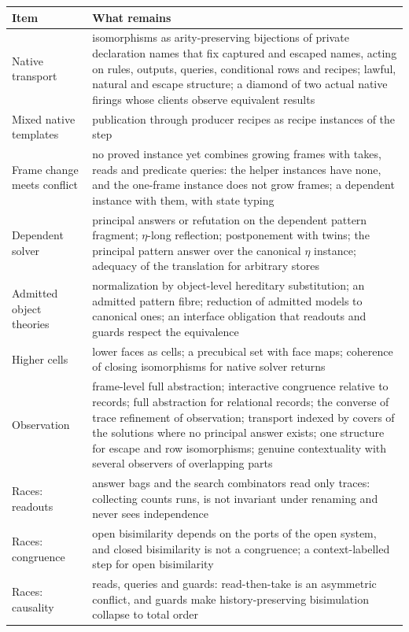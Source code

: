 \documentclass[11pt]{article}
\theoremstyle{remark}
\begin{document}
{\small
\begin{longtable}{@{}L{0.30\textwidth}L{0.65\textwidth}@{}}
\toprule
\textbf{Item} & \textbf{What remains} \\
\midrule
\endhead
Native transport & isomorphisms as arity-preserving bijections of private declaration names that fix captured and escaped names, acting on rules, outputs, queries, conditional rows and recipes; lawful, natural and escape structure; a diamond of two actual native firings whose clients observe equivalent results \\
Mixed native templates & publication through producer recipes as recipe instances of the step \\
Frame change meets conflict & no proved instance yet combines growing frames with takes, reads and predicate queries: the helper instances have none, and the one-frame instance does not grow frames; a dependent instance with them, with state typing \\
Dependent solver & principal answers or refutation on the dependent pattern fragment; $\eta$-long reflection; postponement with twins; the principal pattern answer over the canonical $\eta$ instance; adequacy of the translation for arbitrary stores \\
Admitted object theories & normalization by object-level hereditary substitution; an admitted pattern fibre; reduction of admitted models to canonical ones; an interface obligation that readouts and guards respect the equivalence \\
Higher cells & lower faces as cells; a precubical set with face maps; coherence of closing isomorphisms for native solver returns \\
Observation & frame-level full abstraction; interactive congruence relative to records; full abstraction for relational records; the converse of trace refinement of observation; transport indexed by covers of the solutions where no principal answer exists; one structure for escape and row isomorphisms; genuine contextuality with several observers of overlapping parts \\
Races: readouts & answer bags and the search combinators read only traces: collecting counts runs, is not invariant under renaming and never sees independence \\
Races: congruence & open bisimilarity depends on the ports of the open system, and closed bisimilarity is not a congruence; a context-labelled step for open bisimilarity \\
Races: causality & reads, queries and guards: read-then-take is an asymmetric conflict, and guards make history-preserving bisimulation collapse to total order \\

\end{longtable}}
\end{document}
